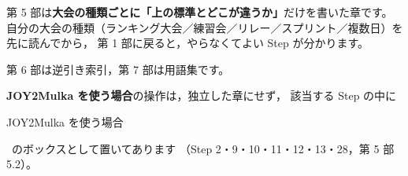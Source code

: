 \vspace{2mm}
\begin{Note}[第 5 部以降の使い方]
第 5 部は\textbf{大会の種類ごとに「上の標準とどこが違うか」}だけを書いた章です。
自分の大会の種類（ランキング大会／練習会／リレー／スプリント／複数日）を先に読んでから，
第 1 部に戻ると，やらなくてよい Step が分かります。

第 6 部は逆引き索引，第 7 部は用語集です。

\textbf{JOY2Mulka を使う場合}の操作は，独立した章にせず，
該当する Step の中に\ \colorbox{j2mfr}{\color{white}\sffamily\bfseries\scriptsize\strut JOY2Mulka を使う場合}\
のボックスとして置いてあります
（Step 2・9・10・11・12・13・28，第 5 部 5.2）。
\end{Note}
